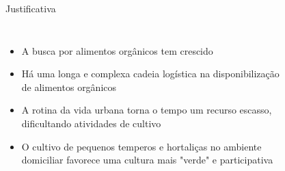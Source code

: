 \begin{frame}[t]{Justificativa} 
    \transdissolve[duration=0.5]
        \begin{columns}[t]
                \begin{itemize}
                    \justifying
                    \item A busca por alimentos orgânicos tem crescido  \cite{sebrae:organicos}
                    \item Há uma longa e complexa cadeia logística na disponibilização de alimentos orgânicos \cite{silva:cadeiaprodutiva}
                    \item A rotina da vida urbana torna o tempo um recurso escasso, dificultando atividades de cultivo \cite{G1:3xtransito}                 
                    \item O cultivo de pequenos temperos e hortaliças no ambiente domiciliar favorece uma cultura mais "verde" e participativa \cite{G1:pequenoagricultor}
                \end{itemize}
            \begin{center}
                \begin{figure}
                    \hspace{125pt}
                \end{figure}
            \end{center}
        \end{columns}
\end{frame}

